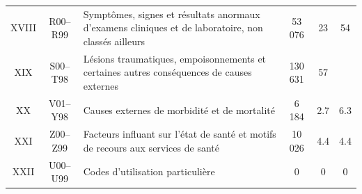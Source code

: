 \documentclass[12pt,english,french,twoside]{book}\usepackage[]{graphicx}\usepackage[]{color}
\begin{document}
\begin{longtable}{|c|c|m{4cm}|c|c|c|}

XVIII&R00–R99&Symptômes, signes et résultats anormaux d'examens cliniques et de laboratoire, non classés ailleurs&53 076&23&54\\

XIX&S00–T98&Lésions traumatiques, empoisonnements et certaines autres conséquences de causes externes&130 631&57& \\

XX&V01–Y98&Causes externes de morbidité et de mortalité& 6 184&2.7&6.3\\

XXI&Z00–Z99&Facteurs influant sur l'état de santé et motifs de recours aux services de santé&10 026&4.4&4.4\\

XXII&U00–U99&Codes d'utilisation particulière & 0&0&0\\

  \hline
\end{longtable}
\end{document}
